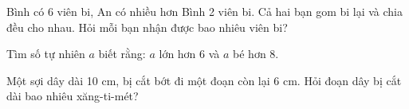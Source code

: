 \begin{ex}
Bình có 6 viên bi, An có nhiều hơn Bình 2 viên bi. Cả hai bạn gom bi lại và chia đều cho nhau. Hỏi mỗi bạn nhận được bao nhiêu viên bi?
\end{ex}

\begin{ex}
Tìm số tự nhiên $a$ biết rằng: $a$ lớn hơn 6 và $a$ bé hơn 8.
\end{ex}

\begin{ex}
Một sợi dây dài 10 cm, bị cắt bớt đi một đoạn còn lại 6 cm. Hỏi đoạn dây bị cắt dài bao nhiêu xăng-ti-mét?
\end{ex}
